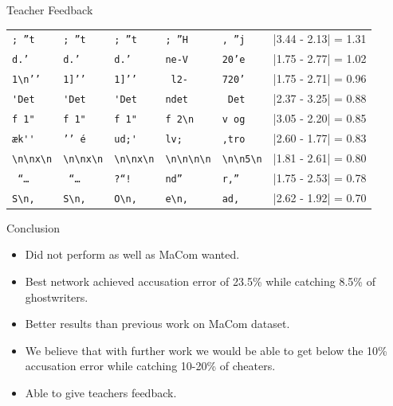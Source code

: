 \documentclass[10pt]{beamer}
\begin{document}
\begin{frame}[fragile]{Teacher Feedback}
\begin{center}
\begin{tabular}{lll|lll}
            \verb[; ”t[       & \verb[; ”t[       & \verb[; ”t[          &
            \verb'; ”H'       & \verb', ”j'       & |3.44 - 2.13| = 1.31 \\

            \verb[d.’ [       & \verb[d.’ [       & \verb[d.’ [          &
            \verb'ne-V'       & \verb'20’e'       & |1.75 - 2.77| = 1.02 \\

            \verb[1\n’’[      & \verb[1]’’[       & \verb[1]’’[          &
            \verb' l2-'       & \verb'720’'       & |1.75 - 2.71| = 0.96 \\

            \verb['Det[       & \verb['Det[       & \verb['Det[          &
            \verb'ndet'       & \verb' Det'       & |2.37 - 3.25| = 0.88 \\

            \verb[f 1"[       & \verb[f 1"[       & \verb[f 1"[          &
            \verb'f 2\n'      & \verb'v og'       & |3.05 - 2.20| = 0.85 \\

            \verb[æk''[       & \verb[’’ é[       & \verb[ud;'[          &
            \verb'lv; '       & \verb',tro'       & |2.60 - 1.77| = 0.83 \\

            \verb[\n\nx\n[    & \verb[\n\nx\n[    & \verb[\n\nx\n[       &
            \verb'\n\n\n\n'   & \verb'\n\n5\n'    & |1.81 - 2.61| = 0.80 \\
            \verb[ “… [       & \verb[ “… [       & \verb[?“! [          &
            \verb'nd” '       & \verb'r,” '       & |1.75 - 2.53| = 0.78 \\

            \verb[S\n, [      & \verb[S\n, [      & \verb[O\n, [         &
            \verb'e\n, '      & \verb'ad, '       & |2.62 - 1.92| = 0.70 \\
        \end{tabular}
    \end{center}
\end{frame}

\begin{frame}[fragile]{Conclusion}
    \begin{itemize}
        \item Did not perform as well as MaCom wanted.
        \item Best network achieved accusation error of 23.5\% while catching
            8.5\% of ghostwriters.
        \item Better results than previous work on MaCom dataset.
        \item We believe that with further work we would be able to get below
            the 10\% accusation error while catching 10-20\% of cheaters.
        \item Able to give teachers feedback.
    \end{itemize}
\end{frame}
\end{document}
